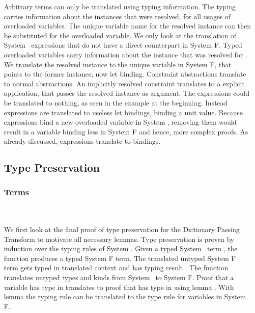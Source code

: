 \noindent Arbitrary terms can only be translated using typing information. 
The typing carries information about the instances that were resolved, for all usages of overloaded variables. 
The unique variable name for the resolved instance can then be substituted for the overloaded variable. 
We only look at the translation of System \Fo\ expressions that do not have a direct counterpart in System F.
\DPTTerms
Typed overloaded variables  carry information about the instance that was resolved for .
We translate the resolved instance to the unique variable in System F, that points to the former instance, now let binding. 
Constraint abstractions translate to normal abstractions. 
An implicitly resolved constraint translates to a explicit application, that passes the resolved instance as argument. 
The  expressions could be translated to nothing, as seen in the example at the beginning. 
Instead  expressions are translated to useless let bindings, binding a unit value.
Because  expressions bind a new overloaded variable in System \Fo, removing them would result in a variable binding less in System F and hence, more complex proofs.
As already discussed,  expressions translate to  bindings.

\subsection{Type Preservation}
\subsubsection{Terms}\hfill\\\\
We first look at the final proof of type preservation for the Dictionary Passing Transform to motivate all necessary lemmas. 
Type preservation is proven by induction over the typing rules of System \Fo. 
Given a typed System \Fo\ term , the function  produces a typed System F term. 
The translated untyped System F term   gets typed in translated context   and has typing result  . 
The function  translates untyped types and kinds from System \Fo\ to System F.
\DPTTermPres
Proof that a variable  has type  in  translates to proof that  has type   in   using lemma . 
With lemma  the typing rule  can be translated to the type rule for variables in System F. 

